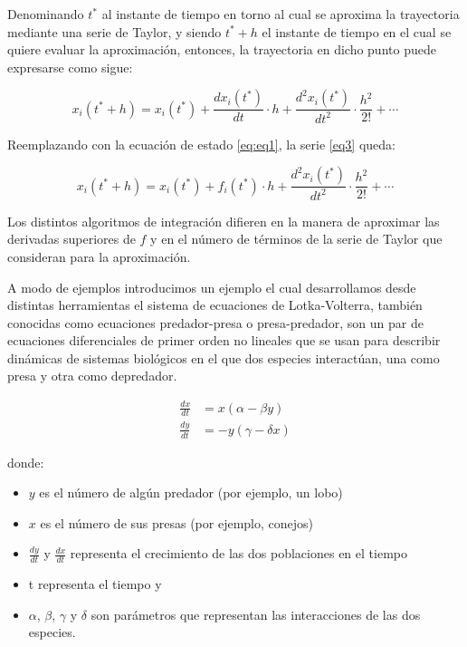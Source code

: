 	Denominando $t^{\ast}$ al instante de tiempo en torno al cual se aproxima la trayectoria mediante una serie de Taylor, y siendo $t^{\ast} + h$
	 el instante de tiempo en el cual se quiere evaluar la aproximación, entonces, la trayectoria en dicho punto puede expresarse como sigue:

	\begin{equation} \label{eq3}
		x_i(t^* + h) = x_i(t^*) + \frac{dx_i (t^*)}{dt} \cdot h + \frac{d^{2}x_i (t^*)}{dt^2} \cdot \frac{h^2}{2!} + \cdots
	\end{equation}

	Reemplazando con la ecuación de estado \ref{eq:eq1}, la serie \eqref{eq3} queda:

	\begin{equation} \label{eq4}
		x_i(t^* + h) = x_i(t^*) + f_i(t^*) \cdot h + \frac{d^{2}x_i (t^*)}{dt^2} \cdot \frac{h^2}{2!} + \cdots
	\end{equation}

	Los distintos algoritmos de integración difieren en la manera de aproximar las derivadas superiores de $f$ y en el número de
	 términos de la serie de Taylor que consideran para la aproximación.

	A modo de ejemplos introducimos un ejemplo el cual desarrollamos desde distintas herramientas el sistema de ecuaciones de Lotka-Volterra, también 
	conocidas como ecuaciones predador-presa o presa-predador, son un par de ecuaciones diferenciales de primer orden no lineales que se usan para 
	describir dinámicas de sistemas biológicos en el que dos especies interactúan, una como presa y otra como depredador.

	\begin{align*}
		\frac{dx}{dt} &= x(\alpha - \beta y) \\
		\frac{dy}{dt} &= - y(\gamma - \delta  x)
	\end{align*}

	donde:
	\begin{itemize}
		\item $y$ es el número de algún predador (por ejemplo, un lobo)
		\item $x$ es el número de sus presas (por ejemplo, conejos)
		\item $\frac{dy}{dt}$ y $\frac{dx}{dt}$ representa el crecimiento de las dos poblaciones en el tiempo
		\item t representa el tiempo y
		\item $\alpha$, $\beta$, $\gamma$ y $\delta$ son parámetros que representan las interacciones de las dos especies.
	\end{itemize}


